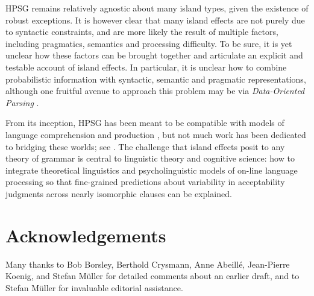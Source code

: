 \documentclass[output=paper
 	        ,biblatex
                ,babelshorthands
                ,newtxmath
                ,draftmode
                ,colorlinks, citecolor=brown
]{langscibook}
\begin{document}
HPSG remains relatively agnostic about many island types, given the existence of robust exceptions.
It is however clear that many island effects are not purely due to syntactic constraints, and are
more likely the result of multiple factors, including pragmatics, semantics and processing
difficulty.  To be sure, it is yet unclear how these factors can be brought together and articulate
an explicit and testable account of island effects. In particular, it is unclear how to combine
probabilistic information with syntactic, semantic and pragmatic representations, although one
fruitful avenue to approach this problem may be via \emph{Data-Oriented Parsing}
\citep{NF2002a-u,NF99a,Arnold:Linardaki:07,BSS2003a-ed,Bod2009a}.


From its inception, HPSG has been meant to be compatible with models of language comprehension and
production \citep{sagser,Sag:Wasow:ta,Sag:Wasow:ta2}, but not much work has been dedicated to
bridging these worlds; see . The challenge that island effects posit to
any theory of grammar is central to linguistic theory and cognitive science: how to integrate
theoretical linguistics and psycholinguistic models of on-line language processing so that
fine-grained predictions about variability in acceptability judgments across nearly isomorphic
clauses can be explained.


 
\section*{Acknowledgements}

Many thanks to Bob Borsley, Berthold Crysmann, Anne Abeillé, Jean-Pierre Koenig, and Stefan Müller
for detailed comments about an earlier draft, and to Stefan Müller for invaluable editorial
assistance.

{\sloppy
\printbibliography[heading=subbibliography,notkeyword=this] 
}
\end{document}

